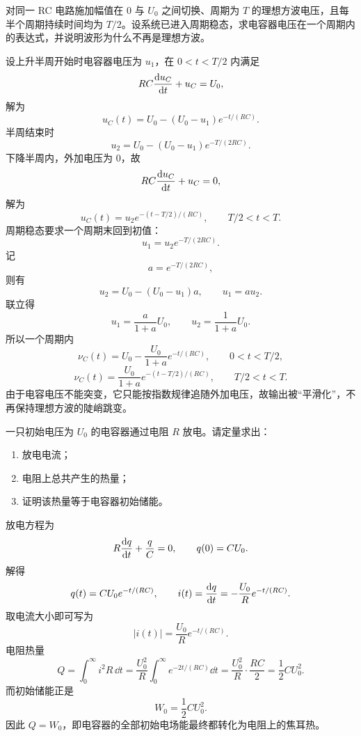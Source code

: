\begin{competition}
对同一 RC 电路施加幅值在 $0$ 与 $U_0$ 之间切换、周期为 $T$ 的理想方波电压，且每半个周期持续时间均为 $T/2$。设系统已进入周期稳态，求电容器电压在一个周期内的表达式，并说明波形为什么不再是理想方波。

\begin{solution}
设上升半周开始时电容器电压为 $u_1$，在 $0<t<T/2$ 内满足
\[
RC\dv{u_C}{t}+u_C=U_0,
\]
解为
\[
u_C(t)=U_0-(U_0-u_1)e^{-t/(RC)}.
\]
半周结束时
\[
u_2=U_0-(U_0-u_1)e^{-T/(2RC)}.
\]
下降半周内，外加电压为 $0$，故
\[
RC\dv{u_C}{t}+u_C=0,
\]
解为
\[
u_C(t)=u_2 e^{-(t-T/2)/(RC)},\qquad T/2<t<T.
\]
周期稳态要求一个周期末回到初值：
\[
u_1=u_2 e^{-T/(2RC)}.
\]
记
\[
a=e^{-T/(2RC)},
\]
则有
\[
u_2=U_0-(U_0-u_1)a,
\qquad
u_1=au_2.
\]
联立得
\[
u_1=\frac{a}{1+a}U_0,
\qquad
u_2=\frac{1}{1+a}U_0.
\]
所以一个周期内
\[
\nu_C(t)=U_0-\frac{U_0}{1+a}e^{-t/(RC)},\qquad 0<t<T/2,
\]
\[
\nu_C(t)=\frac{U_0}{1+a}e^{-(t-T/2)/(RC)},\qquad T/2<t<T.
\]
由于电容电压不能突变，它只能按指数规律追随外加电压，故输出被“平滑化”，不再保持理想方波的陡峭跳变。
\end{solution}
\end{competition}

\begin{competition}
一只初始电压为 $U_0$ 的电容器通过电阻 $R$ 放电。请定量求出：
\begin{enumerate}
  \item 放电电流；
  \item 电阻上总共产生的热量；
  \item 证明该热量等于电容器初始储能。
\end{enumerate}

\begin{solution}
放电方程为
\[
R\dv{q}{t}+\frac{q}{C}=0,
\qquad q(0)=CU_0.
\]
解得
\[
q(t)=CU_0e^{-t/(RC)},
\qquad i(t)=\dv{q}{t}=-\frac{U_0}{R}e^{-t/(RC)}.
\]
取电流大小即可写为
\[
|i(t)|=\frac{U_0}{R}e^{-t/(RC)}.
\]
电阻热量
\[
Q=\int_0^{\infty} i^2R\,\dd{t}
=\frac{U_0^2}{R}\int_0^{\infty} e^{-2t/(RC)}\dd{t}
=\frac{U_0^2}{R}\cdot \frac{RC}{2}
=\frac12 CU_0^2.
\]
而初始储能正是
\[
W_0=\frac12 CU_0^2.
\]
因此 $Q=W_0$，即电容器的全部初始电场能最终都转化为电阻上的焦耳热。
\end{solution}
\end{competition}

